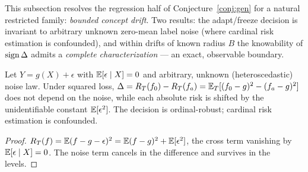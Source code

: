 
This subsection resolves the regression half of Conjecture~\ref{conj:gen} for a natural
restricted family: \emph{bounded concept drift}. Two results: the adapt/freeze decision
is invariant to arbitrary unknown zero-mean label noise (where cardinal risk estimation
is confounded), and within drifts of known radius $B$ the knowability of $\operatorname{sign}\Delta$
admits a \emph{complete characterization} --- an exact, observable boundary.

\begin{proposition}\label{thm:reg-noise}
Let $Y=g(X)+\epsilon$ with $\mathbb{E}[\epsilon\mid X]=0$ and arbitrary, unknown
(heteroscedastic) noise law. Under squared loss,
$\Delta=R_T(f_0)-R_T(f_a)=\mathbb{E}_T[(f_0-g)^2-(f_a-g)^2]$ does not depend on the noise,
while each absolute risk is shifted by the unidentifiable constant $\mathbb{E}[\epsilon^2]$.
The decision is ordinal-robust; cardinal risk estimation is confounded.
\end{proposition}
\begin{proof}
$R_T(f)=\mathbb{E}(f-g-\epsilon)^2=\mathbb{E}(f-g)^2+\mathbb{E}[\epsilon^2]$, the cross term vanishing by
$\mathbb{E}[\epsilon\mid X]=0$. The noise term cancels in the difference and survives in the
levels.
\end{proof}

